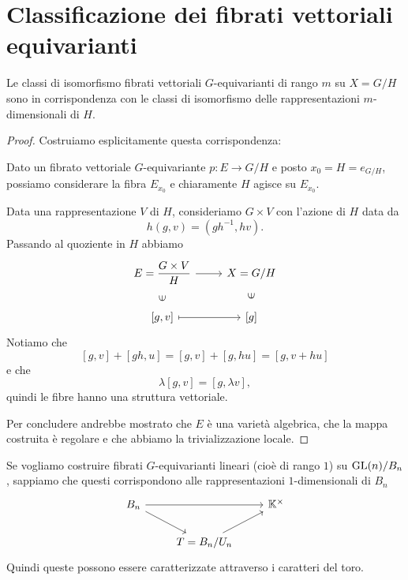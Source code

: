 \section{Classificazione dei fibrati vettoriali equivarianti}
\begin{proposition}\label{PrClassificazioneFibratiSuGruppoQuoziente}
Le classi di isomorfismo fibrati vettoriali $G$-equivarianti di rango $m$ su $X=G/H$ sono in corrispondenza con le classi di isomorfismo delle rappresentazioni $m$-dimensionali di $H$.
\end{proposition}
\begin{proof}
Costruiamo esplicitamente questa corrispondenza:
\smallskip

\noindent
Dato un fibrato vettoriale $G$-equivariante $p\colon E\to G/H$ e posto $x_0=H=e_{G/H}$, possiamo considerare la fibra $E_{x_0}$ e chiaramente $H$ agisce su $E_{x_0}$. 
\smallskip

\noindent
Data una rappresentazione $V$ di $H$, consideriamo $G\times V$ con l'azione di $H$ data da 
\[h(g,v)=(gh^{-1},hv).\]
Passando al quoziente in $H$ abbiamo
\[\begin{tikzcd}
	{E=\dfrac{G\times V}{H}} & {X={G}/{H}} \\
	{[g,v]} & {[g]}
	\arrow[from=1-1, to=1-2]
	\arrow["\in"{marking, allow upside down}, draw=none, from=2-1, to=1-1]
	\arrow[maps to, from=2-1, to=2-2]
	\arrow["\in"{marking, allow upside down}, draw=none, from=2-2, to=1-2]
\end{tikzcd}\]
Notiamo che 
\[[g,v]+[gh,u]=[g,v]+[g,hu]=[g,v+hu]\] 
e che 
\[\lambda[g,v]=[g,\lambda v],\]
quindi le fibre hanno una struttura vettoriale.

Per concludere andrebbe mostrato che $E$ è una varietà algebrica, che la mappa costruita è regolare e che abbiamo la trivializzazione locale.
\end{proof}



\begin{example}
Se vogliamo costruire fibrati $G$-equivarianti lineari (cioè di rango $1$) su $\mathrm{GL}(n)/B_n$, sappiamo che questi corrispondono alle rappresentazioni $1$-dimensionali di $B_n$ 
\[\begin{tikzcd}
	{B_n} && {\K^\times} \\
	& {T=B_n/U_n}
	\arrow[from=1-1, to=1-3]
	\arrow[from=1-1, to=2-2]
	\arrow[from=2-2, to=1-3]
\end{tikzcd}\]
Quindi queste possono essere caratterizzate attraverso i caratteri del toro.
\end{example}




